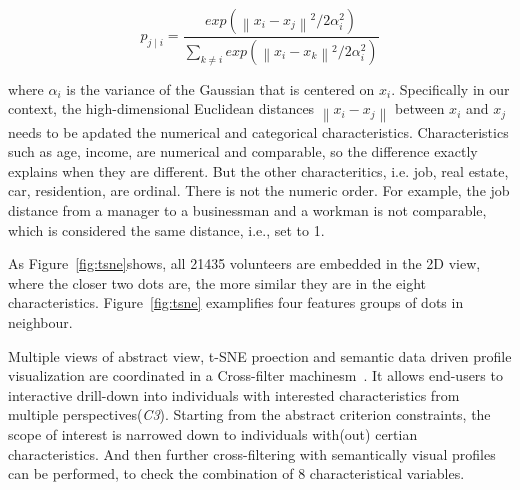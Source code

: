 \begin{equation}
p_{j\mid i} = \frac{exp({\left \| x_i - x_j \right \|}^2/2\alpha_i ^{2})}{\sum _{k\neq i}exp({\left \| x_i - x_k \right \|}^2/2\alpha_i ^{2})}
\end{equation}

where $\alpha_i$ is the variance of the Gaussian that is centered on $x_i$. Specifically in our context, the high-dimensional Euclidean distances $\left \| x_i - x_j \right \|$ between $x_i$ and $x_j$ needs to be apdated the numerical and categorical characteristics. Characteristics such as age, income, are numerical and comparable, so the difference exactly explains when they are different. But the other characteritics, i.e. job, real estate, car, residention, are ordinal. There is not the numeric order. For example, the job distance from a manager to a businessman and a workman is not comparable, which is considered the same distance, i.e., set to 1. 



As Figure~\ref{fig:tsne}shows, all 21435 volunteers are embedded in the 2D view, where the closer two dots are, the more similar they are in the eight characteristics. Figure~\ref{fig:tsne} examplifies four features groups of dots in neighbour. 

Multiple views of abstract view, t-SNE proection and semantic data driven profile visualization are coordinated in a Cross-filter machinesm~\cite{Weaver2010}. It allows end-users to interactive drill-down into individuals with interested characteristics from multiple perspectives(\textit{C3}). Starting from the abstract criterion constraints, the scope of interest is narrowed down to individuals with(out) certian characteristics. And then further cross-filtering with semantically visual profiles can be performed, to check the combination of 8 characteristical variables. 

